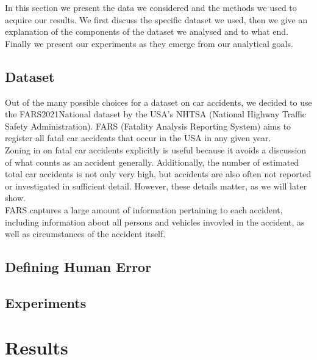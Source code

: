 \documentclass{article}
\theoremstyle{plain}
\theoremstyle{definition}
\theoremstyle{remark}
\begin{document}

In this section we present the data we considered and the methods we used to acquire our results. We first discuss the specific dataset we used, then we give an explanation of the components of the dataset we analysed and to what end. Finally we present our experiments as they emerge from our analytical goals.



\subsection{Dataset}
Out of the many possible choices for a dataset on car accidents, we decided to use the FARS2021National dataset by the USA's NHTSA (National Highway Traffic Safety Administration). FARS (Fatality Analysis Reporting System) aims to register all fatal car accidents that occur in the USA in any given year.\\
Zoning in on fatal car accidents explicitly is useful because it avoids a discussion of what counts as an accident generally. Additionally, the number of estimated total car accidents is not only very high, but accidents are also often not reported or investigated in sufficient detail. However, these details matter, as we will later show.\\
FARS captures a large amount of information pertaining to each accident, including information about all persons and vehicles invovled in the accident, as well as circumstances of the accident itself.

\subsection{Defining Human Error}


\subsection{Experiments}



\section{Results}\label{sec:results}

\end{document}
